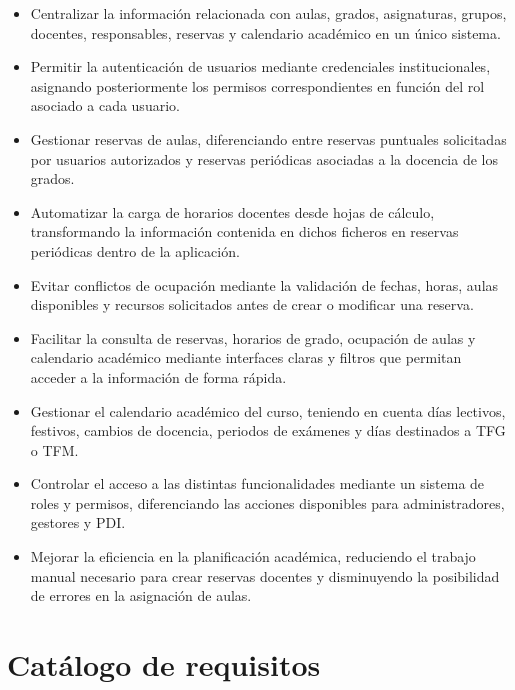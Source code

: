 \begin{itemize}
	\item Centralizar la información relacionada con aulas, grados, asignaturas, grupos, docentes, responsables, reservas y calendario académico en un único sistema.
	
	\item Permitir la autenticación de usuarios mediante credenciales institucionales, asignando posteriormente los permisos correspondientes en función del rol asociado a cada usuario.
	
	\item Gestionar reservas de aulas, diferenciando entre reservas puntuales solicitadas por usuarios autorizados y reservas periódicas asociadas a la docencia de los grados.
	
	\item Automatizar la carga de horarios docentes desde hojas de cálculo, transformando la información contenida en dichos ficheros en reservas periódicas dentro de la aplicación.
	
	\item Evitar conflictos de ocupación mediante la validación de fechas, horas, aulas disponibles y recursos solicitados antes de crear o modificar una reserva.
	
	\item Facilitar la consulta de reservas, horarios de grado, ocupación de aulas y calendario académico mediante interfaces claras y filtros que permitan acceder a la información de forma rápida.
	
	\item Gestionar el calendario académico del curso, teniendo en cuenta días lectivos, festivos, cambios de docencia, periodos de exámenes y días destinados a TFG o TFM.
	
	\item Controlar el acceso a las distintas funcionalidades mediante un sistema de roles y permisos, diferenciando las acciones disponibles para administradores, gestores y PDI.
	
	\item Mejorar la eficiencia en la planificación académica, reduciendo el trabajo manual necesario para crear reservas docentes y disminuyendo la posibilidad de errores en la asignación de aulas.
	
\end{itemize}

\section{Catálogo de requisitos}

